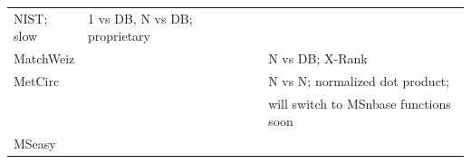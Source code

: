 \documentclass[]{article}
\begin{document}
\begin{longtable}[]{@{}llll@{}}
\begin{minipage}[t]{0.17\columnwidth}
NIST; slow\strut
\end{minipage} & \begin{minipage}[t]{0.46\columnwidth}\raggedright
1 vs DB, N vs DB; proprietary\strut
\end{minipage}\tabularnewline
\begin{minipage}[t]{0.09\columnwidth}\raggedright
MatchWeiz\strut
\end{minipage} & \begin{minipage}[t]{0.17\columnwidth}\raggedright
\strut
\end{minipage} & \begin{minipage}[t]{0.17\columnwidth}\raggedright
\strut
\end{minipage} & \begin{minipage}[t]{0.46\columnwidth}\raggedright
N vs DB; X-Rank\strut
\end{minipage}\tabularnewline
\begin{minipage}[t]{0.09\columnwidth}\raggedright
MetCirc\strut
\end{minipage} & \begin{minipage}[t]{0.17\columnwidth}\raggedright
\strut
\end{minipage} & \begin{minipage}[t]{0.17\columnwidth}\raggedright
\strut
\end{minipage} & \begin{minipage}[t]{0.46\columnwidth}\raggedright
N vs N; normalized dot product;\strut
\end{minipage}\tabularnewline
\begin{minipage}[t]{0.09\columnwidth}\raggedright
\strut
\end{minipage} & \begin{minipage}[t]{0.17\columnwidth}\raggedright
\strut
\end{minipage} & \begin{minipage}[t]{0.17\columnwidth}\raggedright
\strut
\end{minipage} & \begin{minipage}[t]{0.46\columnwidth}\raggedright
will switch to MSnbase functions soon\strut
\end{minipage}\tabularnewline
\begin{minipage}[t]{0.09\columnwidth}\raggedright
MSeasy\strut
\end{minipage} & \begin{minipage}[t]{0.17\columnwidth}\raggedright
\strut
\end{minipage} & \begin{minipage}[t]{0.17\columnwidth}\raggedright

\end{minipage}
\end{longtable}
\end{document}
